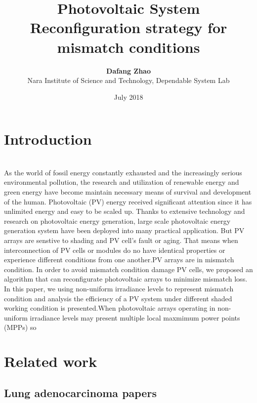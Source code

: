 \documentclass[twocolumn,12pt]{article}
\title{\textbf{Photovoltaic System Reconfiguration strategy for mismatch conditions}}%
\date{July 2018}
\author{\textbf{Dafang Zhao}\\Nara Institute of Science and Technology, Dependable System Lab}
\begin{document}
\maketitle

\section{Introduction}
\\As the world of fossil energy constantly exhausted and the increasingly serious environmental pollution, the research and utilization of renewable energy and green energy have become maintain necessary means of survival and development of the human. Photovoltaic (PV) energy received significant attention since it has unlimited energy and easy to be scaled up. Thanks to extensive technology and research on photovoltaic energy generation, large scale photovoltaic energy generation system have been deployed into many practical application. But PV arrays are senstive to shading and PV cell's fault or aging. That means when interconnection of PV cells or modules do no have identical properties or experience different conditions from one another.PV arrays are in mismatch condition. In order to avoid mismatch condition damage PV cells, we proposed an algorithm that can reconfigurate photovoltaic arrays to minimize mismatch loss.
\\In this paper, we using non-uniform irradiance levels to represent mismatch condition and analysis the efficiency of a PV system under different shaded working condition is presented.When photovoltaic arrays operating in non-uniform irradiance levels may present multiple local maxmimum power points (MPPs) \cite{koutroulis2012new} so 
\section{Related work}
\subsection{Lung adenocarcinoma papers}
\end{document}
